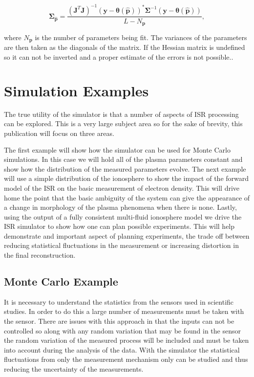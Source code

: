 \documentclass[draft,ras]{agutex}
\begin{document}
\begin{article}
\begin{equation}
\label{eqn:jacinv}
\bm{\Sigma}_{\hat{\mathbf{p}}}=\frac{(\mathbf{J}^T\mathbf{J})^{-1} (\mathbf{y}-\bm{\theta}(\hat{\mathbf{p}}))^*\bm{\Sigma}^{-1}(\mathbf{y}-\bm{\theta}(\hat{\mathbf{p}}))}{L-N_{\mathbf{p}}},
\end{equation}

\noindent where $N_{\mathbf{p}}$ is the number of parameters being fit. The variances of the parameters are then taken as the diagonals of the matrix. If the Hessian matrix is undefined so it can not be inverted and a proper estimate of the errors is not possible..

\section{Simulation Examples}
The true utility of the simulator is that a number of aspects of ISR processing can be explored. This is a very large subject area so for the sake of brevity, this publication will focus on three areas.  

The first example will show how the simulator can be used for Monte Carlo simulations. In this case we will hold all of the plasma parameters constant and show how the distribution of the measured parameters evolve. The next example will use a simple distribution of the ionosphere to show the impact of the forward model of the ISR on the basic measurement of electron density. This will drive home the point that the basic ambiguity of the system can give the appearance of a change in morphology of the plasma phenomena when there is none. Lastly, using the output of a fully consistent multi-fluid ionosphere model we drive the ISR simulator to show how one can plan possible experiments. This will help demonstrate and important aspect of planning experiments, the trade off between reducing statistical fluctuations in the measurement or increasing distortion in the final reconstruction.

\subsection{Monte Carlo Example}
It is necessary to understand the statistics from the sensors used in scientific studies. In order to do this a large number of measurements must be taken with the sensor. There are issues with this approach in that the inputs can not be controlled so along with any random variation that may be found in the sensor the random variation of the measured process will be included and must be taken into account during the analysis of the data. With the simulator the statistical fluctuations from only the measurement mechanism only can be studied and thus reducing the uncertainty of the measurements.


\end{article}
\end{document}
